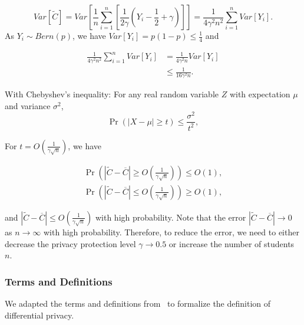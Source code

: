\begin{equation}
    Var\left[ \tilde{C}\right] =Var\left[\frac{1}{n}\sum ^{n}_{i= 1}\left[ \frac{1}{2\gamma }\left( Y_{i}-\frac{1}{2}+\gamma \right) \right]\right] =\frac{1}{4\gamma^{2}n^{2}}\sum ^{n}_{i=1}Var\left[ Y_{i}\right].
\end{equation}
As $Y_{i}\sim Bern\left(p\right) $, we have $Var\left[Y_i\right] =p\left(1-p\right)\leq\frac{1}{4} $ and

\begin{equation}
    \begin{split}
        \frac{1}{4\gamma^{2}n^{2}}\sum ^{n}_{i=1}Var\left[ Y_{i}\right] &= \frac{1}{4\gamma^{2}n} Var\left[ Y_{i}\right] \\
        & \leq \frac{1}{16\gamma^{2}n}.
    \end{split}
\end{equation}


With Chebyshev's inequality: For any real random variable $Z$ with expectation $\mu$ and variance $\sigma^{2}$,
\begin{equation}
    \Pr( \left| X-\mu\right| \geq  t) \leq \frac{\sigma^{2}}{t^{2}},
\end{equation}

For $t=O\left(\frac{1}{\gamma\sqrt{n}}\right) $, we have

\begin{equation}
    \begin{split}
        \Pr \left(\left| \tilde{C}-\overline{C}\right| \geq O\left( \frac{1}{\gamma\sqrt{n}}\right)\right) \leq O\left(1\right), \\
        \Pr \left(\left| \tilde{C}-\overline{C}\right| \leq O\left( \frac{1}{\gamma\sqrt{n}}\right)\right) \geq O\left(1\right) ,
    \end{split}
\end{equation}

and $\left| \tilde{C}-\overline{C}\right| \leq O\left( \frac{1}{\gamma\sqrt{n}}\right)$ with high probability.
Note that the error $\left| \tilde{C}-\overline{C}\right| \to 0$ as $n \to \infty$ with high probability. Therefore, to reduce the error, we need to either decrease the privacy protection level $\gamma \to 0.5$ or increase the number of students $n$.


\subsubsection{Terms and Definitions}
We adapted the terms and definitions from~\cite{dwork2014algorithmic} to formalize the definition of differential privacy.

